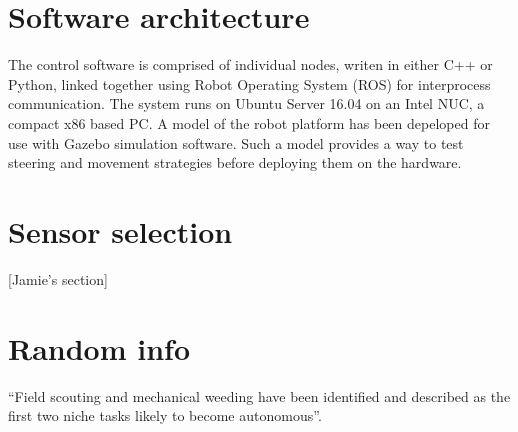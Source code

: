 \documentclass[preprint,authoryear,12pt]{elsarticle}
\begin{document}
\section{Software architecture}
\label{sect:software}
    The control software is comprised of individual nodes, writen in either C++ or Python, linked together using Robot Operating System (ROS) for interprocess communication.
    The system runs on Ubuntu Server 16.04 on an Intel NUC, a compact x86 based PC.
    A model of the robot platform has been depeloped for use with Gazebo simulation software.
    Such a model provides a way to test steering and movement strategies before deploying them on the hardware.

\section{Sensor selection}
\label{sect:sensors}
    [Jamie's section]

\section{Random info}

``Field scouting and mechanical weeding have been identified and described as the first two niche tasks likely to become autonomous''\citep{Blackmore2004}.






\end{document}
